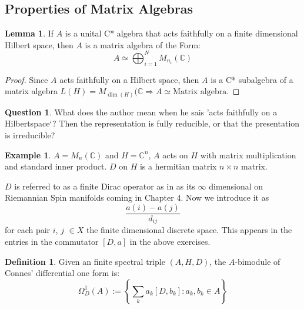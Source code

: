 \documentclass[a4paper]{article}
\newcounter{exercise}
\theoremstyle{definition}
\newtheorem{definition}{Definition}
\theoremstyle{definition}
\newtheorem{question}{Question}
\theoremstyle{definition}
\newtheorem{example}{Example}
\theoremstyle{theorem}
\theoremstyle{theorem}
\newtheorem{lemma}{Lemma}
\begin{document}
\subsection{Properties of Matrix Algebras}
\begin{lemma}
    If $A$ is a unital C* algebra that acts faithfully on a finite
    dimensional Hilbert space, then $A$ is a matrix algebra of the Form:
    \begin{equation}
        A \simeq \bigoplus _{i=1}^N M_{n_i}(\mathbb{C})
    \end{equation}
\end{lemma}
\begin{proof}
    Since $A$ acts faithfully on a Hilbert space, then $A$ is a C*
    subalgebra of a matrix algebra $L(H) = M_{\dim (H)}(\mathbb{C}
    \Rightarrow A \simeq \text{Matrix algebra}$.
\end{proof}

\begin{question}
    What does the author mean when he sais 'acts faithfully on a
    Hilbertspace`? Then the representation is fully reducible, or that the
    presentation is irreducible?
\end{question}

\begin{example}
    $A = M_n(\mathbb{C})$ and $H=\mathbb{C}^n$, $A$ acts on $H$ with matrix
    multiplication and standard inner product. $D$ on $H$ is a hermitian
    matrix $n\times n$ matrix.
\end{example}

$D$ is referred to as a finite Dirac operator as in as its $\infty$
dimensional on Riemannian Spin manifolds coming in Chapter 4. Now we
introduce it as
\begin{equation}
    \frac{a(i)-a(j)}{d_{ij}}
\end{equation}
for each pair $i$, $j$ $\in X$ the finite dimensional discrete space.
This appears in the entries in the commutator $[D, a]$ in the above
exercises.
\begin{definition}
    Given an finite spectral triple $(A, H, D)$, the $A$-bimodule of
    Connes' differential one form is:
    \begin{equation}
        \Omega _D ^1 (A) := \left\{ \sum _k a_k[D, b_k]: a_k, b_k \in A \right\}
    \end{equation}
\end{definition}
\end{document}
